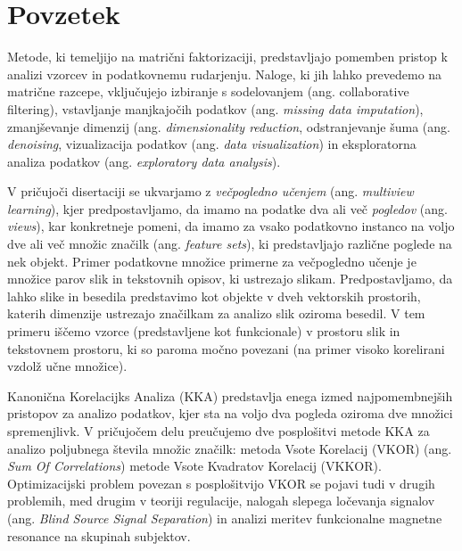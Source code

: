 %
\chapter*{Povzetek}

Metode, ki temeljijo na matrični faktorizaciji, predstavljajo pomemben pristop k analizi vzorcev
in podatkovnemu rudarjenju. Naloge, ki jih lahko prevedemo na matrične razcepe, vključujejo izbiranje 
s sodelovanjem (ang. {collaborative filtering}), vstavljanje manjkajočih podatkov (ang. \emph{missing data imputation}), 
zmanjševanje dimenzij (ang. \emph{dimensionality reduction}, odstranjevanje šuma (ang. \emph{denoising}, vizualizacija
podatkov (ang. \emph{data visualization}) in eksploratorna analiza podatkov (ang. \emph{exploratory data analysis}).

V pričujoči disertaciji se ukvarjamo z \emph{večpogledno učenjem} (ang. \emph{multiview learning}), kjer
predpostavljamo, da imamo na podatke dva ali več \emph{pogledov} (ang. \emph{views}), kar konkretneje
pomeni, da imamo za vsako podatkovno instanco na voljo dve ali več množic značilk (ang. \emph{feature sets}),
ki predstavljajo različne poglede na nek objekt. Primer podatkovne množice primerne za večpogledno učenje
je množice parov slik in tekstovnih opisov, ki ustrezajo slikam. Predpostavljamo, da lahko slike in besedila
predstavimo kot objekte v dveh vektorskih prostorih, katerih dimenzije ustrezajo značilkam za analizo
slik oziroma besedil. V tem primeru iščemo vzorce (predstavljene kot funkcionale) v prostoru slik
in tekstovnem prostoru, ki so paroma močno povezani (na primer visoko korelirani vzdolž učne množice).

Kanonična Korelacijks Analiza (KKA) predstavlja enega izmed najpomembnejših pristopov za analizo
podatkov, kjer sta na voljo dva pogleda oziroma dve množici spremenjlivk. V pričujočem delu
preučujemo dve posplošitvi metode KKA za analizo poljubnega števila množic značilk: metoda
Vsote Korelacij (VKOR) (ang. \emph{Sum Of Correlations}) metode Vsote Kvadratov Korelacij (VKKOR).
Optimizacijski problem povezan s posplošitvijo VKOR se pojavi tudi v drugih problemih, med drugim
v teoriji regulacije, nalogah slepega ločevanja signalov (ang. \emph{Blind Source Signal Separation})
in analizi meritev funkcionalne magnetne resonance na skupinah subjektov.

